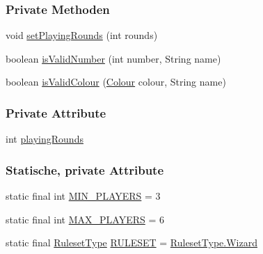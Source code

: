 \subsubsection*{Private Methoden}
\begin{DoxyCompactItemize}
\item 
void \hyperlink{a00069_a20dac5ede6116cf0ca90930d015c4c2a}{set\-Playing\-Rounds} (int rounds)
\item 
boolean \hyperlink{a00069_a2a80072981f095510c4aeb16edc18a33}{is\-Valid\-Number} (int number, String name)
\item 
boolean \hyperlink{a00069_a5107692ee4ad56672e366f68d6714d52}{is\-Valid\-Colour} (\hyperlink{a00058}{Colour} colour, String name)
\end{DoxyCompactItemize}
\subsubsection*{Private Attribute}
\begin{DoxyCompactItemize}
\item 
int \hyperlink{a00069_afdd09d28760a65b79bafdb1551e30585}{playing\-Rounds}
\end{DoxyCompactItemize}
\subsubsection*{Statische, private Attribute}
\begin{DoxyCompactItemize}
\item 
\hypertarget{a00069_a57fe2c01c4e61b1f0c44c70ccc75d903}{static final int \hyperlink{a00069_a57fe2c01c4e61b1f0c44c70ccc75d903}{M\-I\-N\-\_\-\-P\-L\-A\-Y\-E\-R\-S} = 3}\label{a00069_a57fe2c01c4e61b1f0c44c70ccc75d903}

\item 
\hypertarget{a00069_ae6ed433235a83c520ce79bee49bc2b01}{static final int \hyperlink{a00069_ae6ed433235a83c520ce79bee49bc2b01}{M\-A\-X\-\_\-\-P\-L\-A\-Y\-E\-R\-S} = 6}\label{a00069_ae6ed433235a83c520ce79bee49bc2b01}

\item 
\hypertarget{a00069_a3045f525de18ff0ad68134f0d512ea16}{static final \hyperlink{a00066}{Ruleset\-Type} \hyperlink{a00069_a3045f525de18ff0ad68134f0d512ea16}{R\-U\-L\-E\-S\-E\-T} = \hyperlink{a00066_a35e49e93bdb15f20f8e9940d3f54c887}{Ruleset\-Type.\-Wizard}}\label{a00069_a3045f525de18ff0ad68134f0d512ea16}

\end{DoxyCompactItemize}


